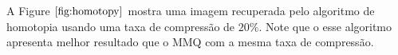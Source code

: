 A Figure $\ref{fig:homotopy}$ mostra uma imagem recuperada pelo algoritmo de homotopia usando uma taxa de compressão de $20\%$. Note que o esse algoritmo apresenta melhor resultado que o MMQ com a mesma taxa de compressão.
